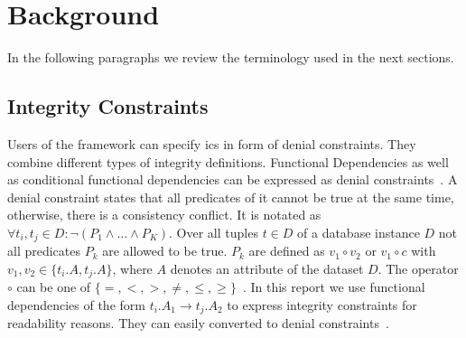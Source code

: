 \section{Background}\label{sec:background}
  In the following paragraphs we review the terminology used in the next sections.
  
  \subsection{Integrity Constraints}
  Users of the \holoclean{} framework can specify \glspl{ic} in form of denial constraints.
  They combine different types of integrity definitions.
  Functional Dependencies as well as conditional functional dependencies can be expressed as denial constraints~\cite{fd_to_dc}.
  A denial constraint states that all predicates of it cannot be true at the same time, otherwise, there is a consistency conflict.
  It is notated as $\forall t_i, t_j \in D: \neg(P_1 \wedge \dots \wedge P_K)$.
  Over all tuples $t \in D$ of a database instance $D$ not all predicates $P_k$ are allowed to be true.
  $P_k$ are defined as $v_1 \circ v_2$ or $v_1 \circ c$ with $v_1, v_2 \in \{t_i.A, t_j.A\}$, where $A$ denotes an attribute of the dataset $D$.
  The operator $\circ$ can be one of $\{=,<,>,\neq,\leq,\geq\}$~\cite{chu2013discoveringdc}.
  In this report we use functional dependencies of the form $t_i.A_1 \rightarrow t_j.A_2$ to express integrity constraints for readability reasons.
  They can easily converted to denial constraints~\cite{fd_to_dc}.
  
